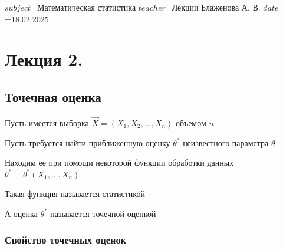 $subject$=Математическая статистика
$teacher$=Лекции Блаженова А. В.
$date$=18.02.2025

\section{Лекция 2.}

\subsection{Точечная оценка}

\hypertarget{point_estimation}{}

Пусть имеется выборка $\vec{X} = (X_1, X_2, \dots, X_n)$ объемом $n$

Пусть требуется найти приближенную оценку $\theta^*$ неизвестного параметра $\theta$

Находим ее при помощи некоторой функции обработки данных $\theta^* = \theta^*(X_1, \dots, X_n)$

\Def Такая функция называется статистикой

\Defs А оценка $\theta^*$ называется точечной оценкой

\subsubsection{Свойство точечных оценок}

